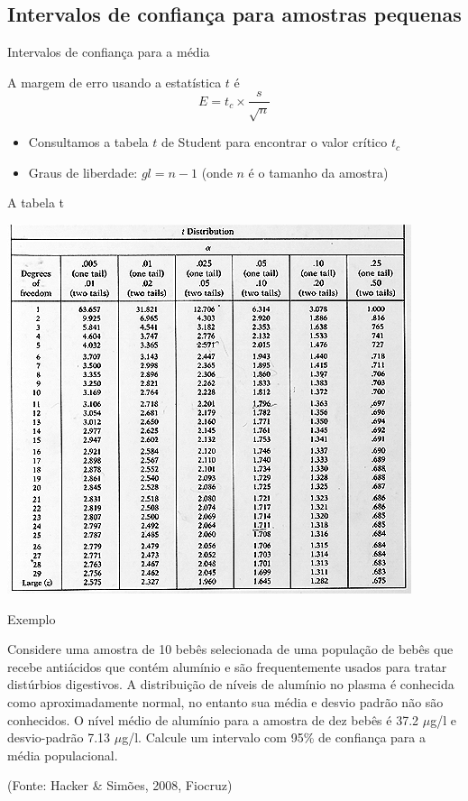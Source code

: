 \documentclass{beamer}
\begin{document}
\subsection{Intervalos de confiança para amostras pequenas}

\begin{frame}{Intervalos de confiança para a média}
  \begin{definition}
    A margem de erro usando a estatística $t$ é
    \begin{displaymath}
      E = t_c \times \frac{s}{\sqrt{n}}
    \end{displaymath}
  \end{definition}
  \begin{itemize}
  \item Consultamos a tabela $t$ de Student para encontrar o valor
    crítico $t_c$
  \item Graus de liberdade: \alert{$gl = n-1$} (onde $n$ é o tamanho da
    amostra)
  \end{itemize}
\end{frame}

\begin{frame}{A tabela t}
  \begin{center}
    \includegraphics[height=0.9\textheight]{Inf_II/t_table}
  \end{center}
\end{frame}

\begin{frame}{Exemplo}
  \begin{example}
    Considere uma amostra de 10 bebês selecionada de uma população de
    bebês que recebe antiácidos que contém alumínio e são
    frequentemente usados para tratar distúrbios digestivos. A
    distribuição de níveis de alumínio no plasma é conhecida como
    aproximadamente normal, no entanto sua média e desvio padrão não
    são conhecidos. O nível médio de alumínio para a amostra de dez
    bebês é 37.2 $\mu$g/l e desvio-padrão 7.13 $\mu$g/l. Calcule um
    intervalo com 95\% de confiança para a média populacional.
  \end{example}
  (Fonte: Hacker \& Simões, 2008, Fiocruz)
\end{frame}
\end{document}
